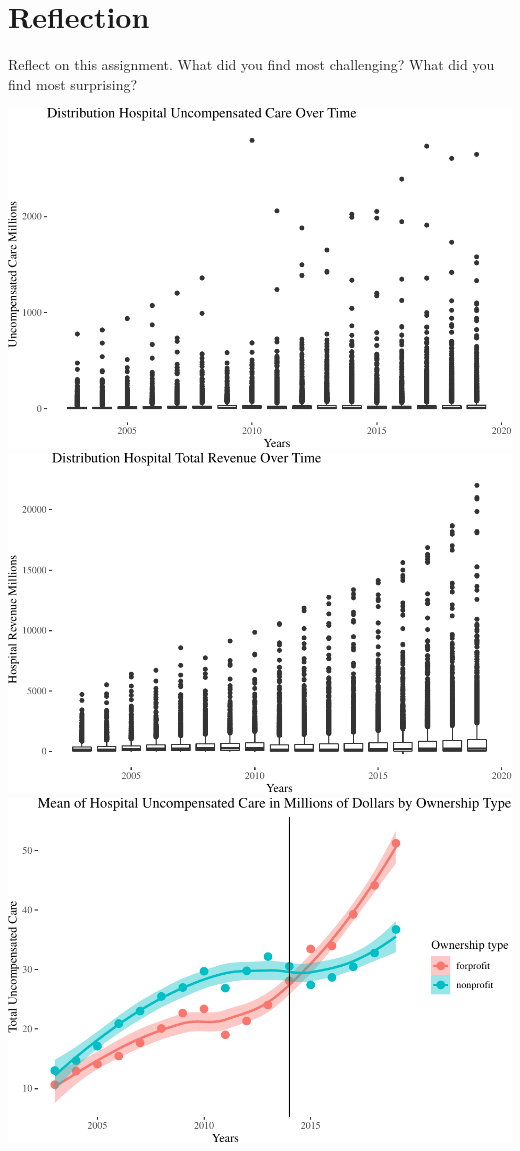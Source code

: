 \documentclass[
]{article}
\begin{document}
\hypertarget{reflection}{%
\section{Reflection}\label{reflection}}

Reflect on this assignment. What did you find most challenging? What did
you find most surprising?

\includegraphics{Report_files/figure-latex/Figures-1.pdf}
\includegraphics{Report_files/figure-latex/Figures-2.pdf}
\includegraphics{Report_files/figure-latex/Figures-3.pdf}
\end{document}
